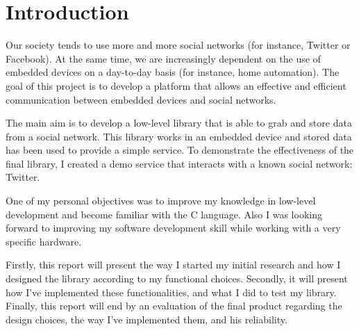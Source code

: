 \chapter{Introduction}

\hspace{15mm}Our society tends to use more and more social networks (for instance, Twitter or Facebook). At the same time, we are increasingly dependent on the use of embedded devices on a day-to-day basis (for instance, home automation). The goal of this project is to develop a platform that allows an effective and efficient communication between embedded devices and social networks.

The main aim is to develop a low-level library that is able to grab and store data from a social network. This library works in an embedded device and stored data has been used to provide a simple service. To demonstrate the effectiveness of the final library, I created a demo service that interacts with a known social network: Twitter.

One of my personal objectives was to improve my knowledge in low-level development and become familiar with the C language. Also I was looking forward to improving my software development skill while working with a very specific hardware.

Firstly, this report will present the way I started my initial research and how I designed the library according to my functional choices. Secondly, it will present how I've implemented these functionalities, and what I did to test my library. Finally, this report will end by an evaluation of the final product regarding the design choices, the way I've implemented them, and his reliability.


\clearpage
